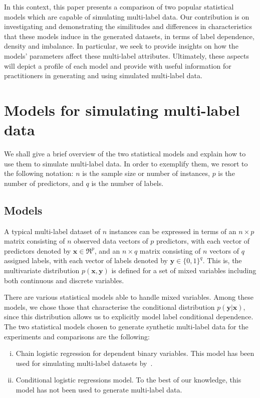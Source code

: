 \documentclass[review]{elsarticle}
\begin{document}
	In this context, this paper presents a comparison of two popular statistical models which are capable of simulating multi-label data. Our contribution is on investigating and demonstrating the similitudes and differences in characteristics that these models induce in the generated datasets, in terms of label dependence, density and imbalance. In particular, we seek to provide insights on how the models' parameters affect these multi-label attributes. Ultimately, these aspects will depict a profile of each model and provide with useful information for practitioners in generating and using simulated multi-label data.
	
	
	\section{Models for simulating multi-label data}
	\label{MODELS}
	
	We shall give a brief overview of the two statistical models and explain how to use them to simulate multi-label data.  In order to exemplify them, we resort to the following notation: $n$ is the sample size or number of instances, $p$ is the number of predictors, and $q$ is the number of labels.
	
	\subsection{Models}\label{ss:models}
	
	A typical multi-label dataset of $n$ instances can be expressed in terms of an $n\times p$ matrix consisting of $n$ observed data vectors of $p$ predictors, with each vector of predictors denoted by $\mathbf{x} \in \Re^{p}$, and an $n\times q$ matrix consisting of $n$ vectors of $q$ assigned labels, with each vector of labels denoted by $\mathbf{y} \in \{ 0,1 \}^{q}$. This is, the multivariate distribution $p(\mathbf{x},\mathbf{y})$ is defined for a set of mixed variables including both continuous and discrete variables.
	
	There are various statistical models able to handle mixed variables. Among these models, we chose those that characterise the conditional distribution $p(\mathbf{y}|\mathbf{x})$, since this distribution allows us to explicitly model label conditional dependence. %
	The two statistical models chosen to generate synthetic multi-label data for the experiments and comparisons are the following:
	\begin{enumerate}[(i)]
		\item Chain logistic regression for dependent binary variables. This model has been used for simulating multi-label datasets by~\citet{PCC}.
		\item Conditional logistic regressions model. To the best of our knowledge, this model has not been used to generate multi-label data.
	\end{enumerate}
	
\end{document}
